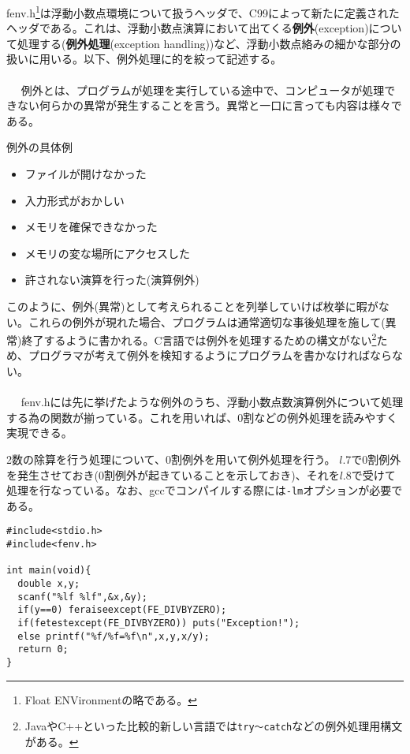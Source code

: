 fenv.h\footnote{Float ENVironmentの略である。}は浮動小数点環境について扱うヘッダで、C99によって新たに定義されたヘッダである。これは、浮動小数点演算において出てくる\textbf{例外}(exception)について処理する(\textbf{例外処理}(exception handling))など、浮動小数点絡みの細かな部分の扱いに用いる。以下、例外処理に的を絞って記述する。
\\ \\　
例外とは、プログラムが処理を実行している途中で、コンピュータが処理できない何らかの異常が発生することを言う。異常と一口に言っても内容は様々である。
\begin{itembox}[l]{例外の具体例}
\begin{itemize}
\item ファイルが開けなかった
\item 入力形式がおかしい
\item メモリを確保できなかった
\item メモリの変な場所にアクセスした
\item 許されない演算を行った(演算例外)
\end{itemize}
\end{itembox}
このように、例外(異常)として考えられることを列挙していけば枚挙に暇がない。これらの例外が現れた場合、プログラムは通常適切な事後処理を施して(異常)終了するように書かれる。C言語では例外を処理するための構文がない\footnote{JavaやC++といった比較的新しい言語では\verb|try〜catch|などの例外処理用構文がある。}ため、プログラマが考えて例外を検知するようにプログラムを書かなければならない。
\\ \\　
fenv.hには先に挙げたような例外のうち、浮動小数点数演算例外について処理する為の関数が揃っている。これを用いれば、0割などの例外処理を読みやすく実現できる。
\begin{boxnote}
2数の除算を行う処理について、0割例外を用いて例外処理を行う。
$l$.7で0割例外を発生させておき(0割例外が起きていることを示しておき)、それを$l$.8で受けて処理を行なっている。なお、gccでコンパイルする際には\verb|-lm|オプションが必要である。
\begin{lstlisting}[caption=0割例外処理,label=program7_3]
#include<stdio.h>
#include<fenv.h>

int main(void){
  double x,y;
  scanf("%lf %lf",&x,&y);
  if(y==0) feraiseexcept(FE_DIVBYZERO);
  if(fetestexcept(FE_DIVBYZERO)) puts("Exception!");
  else printf("%f/%f=%f\n",x,y,x/y);
  return 0;
}
\end{lstlisting}
\end{boxnote}

